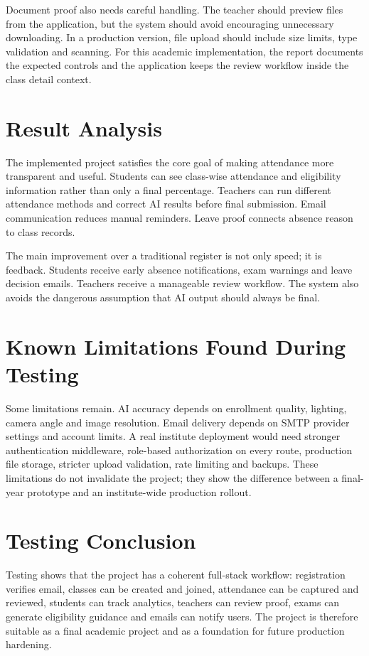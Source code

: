 Document proof also needs careful handling. The teacher should preview files from the application, but the system should avoid encouraging unnecessary downloading. In a production version, file upload should include size limits, type validation and scanning. For this academic implementation, the report documents the expected controls and the application keeps the review workflow inside the class detail context.

\section{Result Analysis}

The implemented project satisfies the core goal of making attendance more transparent and useful. Students can see class-wise attendance and eligibility information rather than only a final percentage. Teachers can run different attendance methods and correct AI results before final submission. Email communication reduces manual reminders. Leave proof connects absence reason to class records.

The main improvement over a traditional register is not only speed; it is feedback. Students receive early absence notifications, exam warnings and leave decision emails. Teachers receive a manageable review workflow. The system also avoids the dangerous assumption that AI output should always be final.

\section{Known Limitations Found During Testing}

Some limitations remain. AI accuracy depends on enrollment quality, lighting, camera angle and image resolution. Email delivery depends on SMTP provider settings and account limits. A real institute deployment would need stronger authentication middleware, role-based authorization on every route, production file storage, stricter upload validation, rate limiting and backups. These limitations do not invalidate the project; they show the difference between a final-year prototype and an institute-wide production rollout.

\section{Testing Conclusion}

Testing shows that the project has a coherent full-stack workflow: registration verifies email, classes can be created and joined, attendance can be captured and reviewed, students can track analytics, teachers can review proof, exams can generate eligibility guidance and emails can notify users. The project is therefore suitable as a final academic project and as a foundation for future production hardening.
